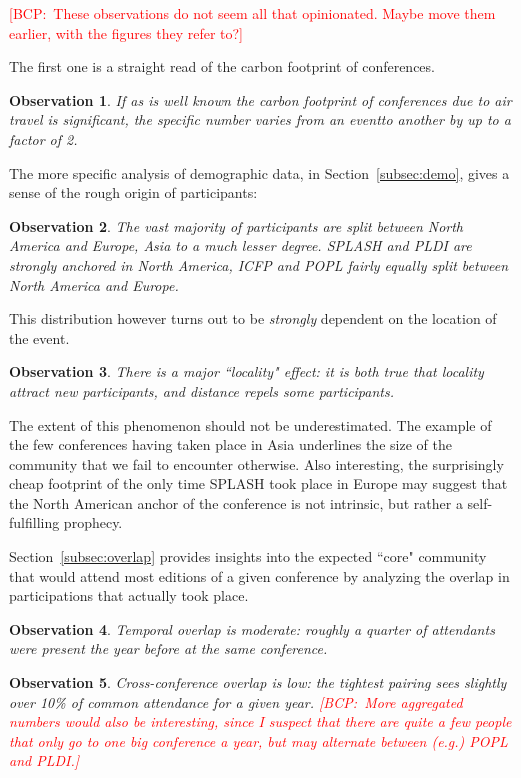 \documentclass{scrartcl}
\newcommand{\bcp}[1]{\textcolor{red}{{[BCP:~#1]}}}
\newcommand{\bcp}[1]{}
\newcommand{\event}{event} %
\newtheorem{obs}{Observation}
\begin{document}
\bcp{These observations do not seem all that opinionated.  Maybe move them
  earlier, with the figures they refer to?}

The first one is a straight read of the carbon footprint of conferences. 
\begin{obs}
If as is well known the carbon footprint of
conferences due to air travel is significant, the specific number
varies from an \event to another by up to a factor of 2.
\label{obs:footprint}
\end{obs}

The more specific analysis of demographic data, in Section~\ref{subsec:demo},
gives a sense of the rough origin of participants:

\begin{obs}
  The vast majority of participants are split between North America and Europe,
  Asia to a much lesser degree. SPLASH and PLDI are strongly anchored in North
  America, ICFP and POPL fairly equally split between North America and Europe.
  \label{obs:dist-naive}
\end{obs}

This distribution however turns out to be \emph{strongly} dependent on the
location of the \event.

\begin{obs}
  There is a major ``locality" effect: it is both true that locality attract
  new participants, and distance repels some participants.
  \label{obs:locality}
\end{obs}

The extent of this phenomenon should not be underestimated. The example of the
few conferences having taken place in Asia underlines the size of the community
that we fail to encounter otherwise. Also interesting, the surprisingly cheap
footprint of the only time SPLASH took place in Europe may suggest that the
North American anchor of the conference is not intrinsic, but rather a
self-fulfilling prophecy.

Section~\ref{subsec:overlap} provides insights into the expected ``core" community
that would attend most editions of a given conference by analyzing the overlap
in participations that actually took place.

\begin{obs}
  Temporal overlap is moderate: roughly a quarter of attendants were present
  the year before at the same conference.
  \label{obs:overlap-temp}
\end{obs}

\begin{obs}
  Cross-conference overlap is low: the tightest pairing sees slightly over 10\%
  of common attendance for a given year.  \bcp{More aggregated numbers would
  also be interesting, since I suspect that there are quite a few people
  that only go to one big conference a year, but may alternate between
  (e.g.) POPL and PLDI.}
  \label{obs:overlap-cross}
\end{obs}
\end{document}
